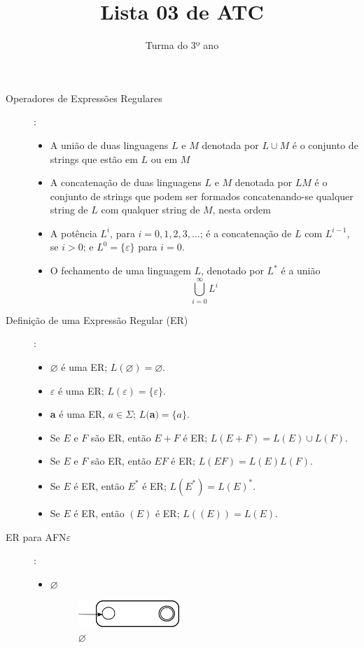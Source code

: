 \documentclass[12pt]{article}
\title{Lista 03 de ATC}
\date{}
\author{Turma do 3º ano}
\def\ve{\varepsilon}
\def\emptyset{\varnothing}
\begin{document}
 

\maketitle

\begin{description}

\item[Operadores de Expressões Regulares]:
\begin{itemize}
\item A união de duas linguagens $L$ e $M$ denotada por $L\cup M$ 
é o conjunto de strings que estão em $L$ ou em $M$
\item A concatenação de duas linguagens $L$ e $M$ denotada por $LM$
é o conjunto de strings que podem ser formados concatenando-se qualquer string de $L$ 
com qualquer string de $M$, 
nesta ordem
\item A potência $L^i$, para $i=0,1,2,3, \dots$; é a concatenação de $L$ com $L^{i-1}$, se $i>0$;
e $L^0 = \{\ve\}$ para $i=0$.
\item O fechamento de uma linguagem $L$, denotado por $L^*$ é a união
\[\bigcup_{i=0}^\infty L^i\]
\end{itemize}

\item[Definição de uma Expressão Regular (ER)]:

\begin{itemize}
\item $\emptyset$ é uma ER; $L(\emptyset) = \emptyset$.
\item $\ve$ é uma ER; $L(\ve) = \{\ve\}$.
\item \textbf{a} é uma ER, $a\in \Sigma$; $L($\textbf{a}$) = \{a\}$.
\item Se $E$ e $F$ são ER, então $E+F$ é ER; $L(E+F) = L(E)\cup L(F)$.
\item Se $E$ e $F$ são ER, então $EF$ é ER; $L(EF) = L(E)L(F)$.
\item Se $E$ é ER, então $E^*$ é ER; $L(E^*) = L(E)^*$.
\item Se $E$ é ER, então $(E)$ é ER; $L((E)) = L(E)$.
\end{itemize}

\break

\item[ER para AFN$\ve$]:
\begin{itemize}
\item $\emptyset$
\begin{figure}[H]
    \centering
    \includegraphics[width=0.4\textwidth]{ERtoAFNeEmpty}
    \caption{$\emptyset$}
    \label{fig:ERtoAFNeEmpty}
\end{figure}


\end{itemize}
\end{description}
\end{document}
